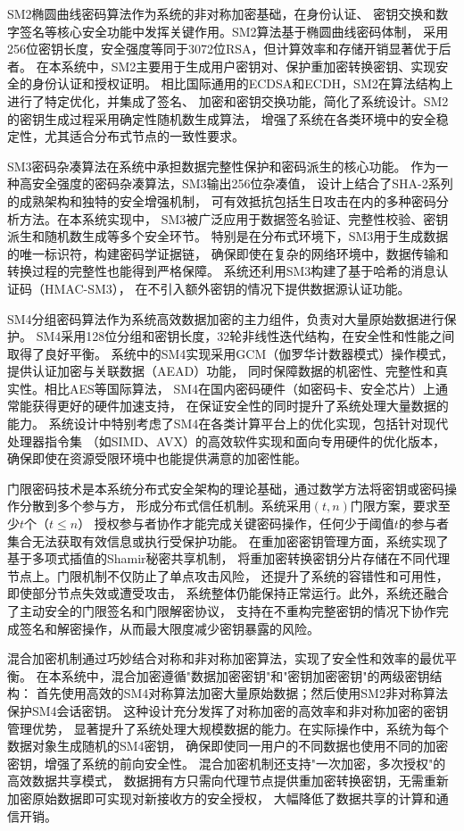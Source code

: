 SM2椭圆曲线密码算法作为系统的非对称加密基础，在身份认证、
密钥交换和数字签名等核心安全功能中发挥关键作用。SM2算法基于椭圆曲线密码体制，
采用256位密钥长度，安全强度等同于3072位RSA，但计算效率和存储开销显著优于后者。
在本系统中，SM2主要用于生成用户密钥对、保护重加密转换密钥、实现安全的身份认证和授权证明。
相比国际通用的ECDSA和ECDH，SM2在算法结构上进行了特定优化，并集成了签名、
加密和密钥交换功能，简化了系统设计。SM2的密钥生成过程采用确定性随机数生成算法，
增强了系统在各类环境中的安全稳定性，尤其适合分布式节点的一致性要求。

SM3密码杂凑算法在系统中承担数据完整性保护和密码派生的核心功能。
作为一种高安全强度的密码杂凑算法，SM3输出256位杂凑值，
设计上结合了SHA-2系列的成熟架构和独特的安全增强机制，
可有效抵抗包括生日攻击在内的多种密码分析方法。在本系统实现中，
SM3被广泛应用于数据签名验证、完整性校验、密钥派生和随机数生成等多个安全环节。
特别是在分布式环境下，SM3用于生成数据的唯一标识符，构建密码学证据链，
确保即使在复杂的网络环境中，数据传输和转换过程的完整性也能得到严格保障。
系统还利用SM3构建了基于哈希的消息认证码（HMAC-SM3），
在不引入额外密钥的情况下提供数据源认证功能。

SM4分组密码算法作为系统高效数据加密的主力组件，负责对大量原始数据进行保护。
SM4采用128位分组和密钥长度，32轮非线性迭代结构，在安全性和性能之间取得了良好平衡。
系统中的SM4实现采用GCM（伽罗华计数器模式）操作模式，提供认证加密与关联数据（AEAD）功能，
同时保障数据的机密性、完整性和真实性。相比AES等国际算法，
SM4在国内密码硬件（如密码卡、安全芯片）上通常能获得更好的硬件加速支持，
在保证安全性的同时提升了系统处理大量数据的能力。
系统设计中特别考虑了SM4在各类计算平台上的优化实现，包括针对现代处理器指令集
（如SIMD、AVX）的高效软件实现和面向专用硬件的优化版本，
确保即使在资源受限环境中也能提供满意的加密性能。

门限密码技术是本系统分布式安全架构的理论基础，通过数学方法将密钥或密码操作分散到多个参与方，
形成分布式信任机制。系统采用$(t,n)$门限方案，要求至少$t$个（$t \leq n$）
授权参与者协作才能完成关键密码操作，任何少于阈值$t$的参与者集合无法获取有效信息或执行受保护功能。
在重加密密钥管理方面，系统实现了基于多项式插值的Shamir秘密共享机制，
将重加密转换密钥分片存储在不同代理节点上。门限机制不仅防止了单点攻击风险，
还提升了系统的容错性和可用性，即使部分节点失效或遭受攻击，
系统整体仍能保持正常运行。此外，系统还融合了主动安全的门限签名和门限解密协议，
支持在不重构完整密钥的情况下协作完成签名和解密操作，从而最大限度减少密钥暴露的风险。

混合加密机制通过巧妙结合对称和非对称加密算法，实现了安全性和效率的最优平衡。
在本系统中，混合加密遵循"数据加密密钥"和"密钥加密密钥"的两级密钥结构：
首先使用高效的SM4对称算法加密大量原始数据；然后使用SM2非对称算法保护SM4会话密钥。
这种设计充分发挥了对称加密的高效率和非对称加密的密钥管理优势，
显著提升了系统处理大规模数据的能力。在实际操作中，系统为每个数据对象生成随机的SM4密钥，
确保即使同一用户的不同数据也使用不同的加密密钥，增强了系统的前向安全性。
混合加密机制还支持"一次加密，多次授权"的高效数据共享模式，
数据拥有方只需向代理节点提供重加密转换密钥，无需重新加密原始数据即可实现对新接收方的安全授权，
大幅降低了数据共享的计算和通信开销。

